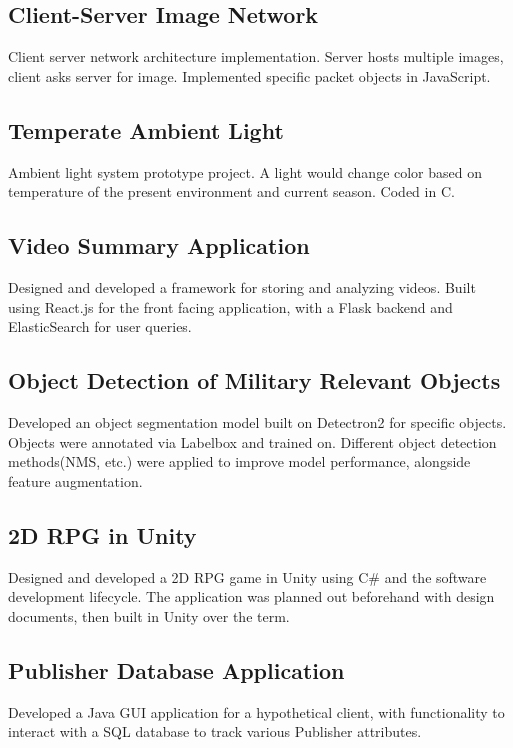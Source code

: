 \documentclass[a4paper, 12pt]{article}
\begin{document}
\subsection {{Client-Server Image Network}\hfill }
Client server network architecture implementation. Server hosts multiple images, client asks server for image. Implemented specific packet objects in JavaScript.
\subsection {{}\hfill }

\subsection {{Temperate Ambient Light}\hfill }
Ambient light system prototype project. A light would change color based on temperature of the present environment and current season. Coded in C.
\subsection {{}\hfill }

\subsection {{Video Summary Application}\hfill }
 Designed and developed a framework for storing and analyzing videos. Built using React.js for the front facing application, with a Flask backend and ElasticSearch for user queries. 

\subsection {{}\hfill }
\subsection {{Object Detection of Military Relevant Objects}\hfill }
Developed an object segmentation model built on Detectron2 for specific objects. Objects were annotated via Labelbox and trained on. Different object detection methods(NMS, etc.) were applied to improve model performance, alongside feature augmentation.
\subsection {{}\hfill }


\subsection {{2D RPG in Unity}\hfill }
Designed and developed a 2D RPG game in Unity using C\# and the software development lifecycle. The application was planned out beforehand with design documents, then built in Unity over the term.
\subsection {{}\hfill }

\subsection {{Publisher Database Application}\hfill }
 Developed a Java GUI application for a hypothetical client, with functionality to interact with a SQL database to track various Publisher attributes.
\end{document}
